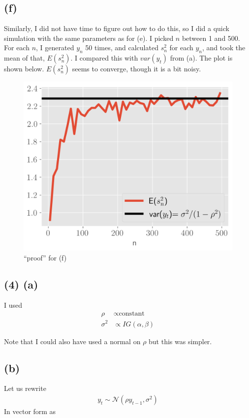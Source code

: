 \documentclass[11pt]{article}
\begin{document}
\subsection*{(f)}
Similarly, I did not have time to figure out how to do this, so I did a quick simulation with the same parameters as for (e). I picked $n$ between 1 and 500. For each $n$, I generated $y_n$ 50 times, and calculated $s_n^2$ for each $y_n$, and took the mean of that, $E(s_n^2)$. I compared this with $var(y_t)$ from (a). The plot is shown below.  $E(s_n^2)$ seems to converge, though it is a bit noisy.

\begin{figure}[!h]
    \centering
    \includegraphics[scale=.5
    ]{../figures/f.png}
    \caption{``proof'' for (f)}
    \label{fig:my_label}
\end{figure}

\subsection*{(4) (a)}
I used 
\begin{align*}
    \rho & \propto \text{constant}\\
    \sigma^2 & \propto IG(\alpha, \beta)
\end{align*}

Note that I could also have used a normal on $\rho$ but this was simpler.

\subsection*{(b)}
Let us rewrite 
\begin{align*}
    y_t \sim \mathcal{N}(\rho y_{t-1}, \sigma^2)
\end{align*}
In vector form as
\end{document}
